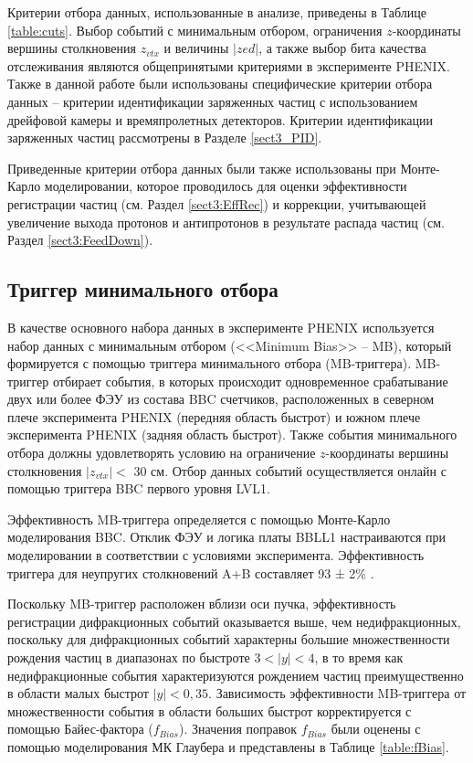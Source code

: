 Критерии отбора данных, использованные в анализе, приведены в Таблице \ref{table:cuts}. Выбор событий с минимальным отбором, ограничения $z$-координаты вершины столкновения $z_{vtx}$ и величины $|zed|$, а также выбор бита качества отслеживания являются общепринятыми критериями в эксперименте PHENIX. Также в данной работе были использованы специфические критерии отбора данных -- критерии идентификации заряженных частиц с использованием дрейфовой камеры и времяпролетных детекторов. Критерии идентификации заряженных частиц рассмотрены в Разделе \ref{sect3_PID}.

Приведенные критерии отбора данных были также использованы при Монте-Карло моделировании, которое проводилось для оценки эффективности регистрации частиц (см. Раздел \ref{sect3:EffRec}) и коррекции, учитывающей увеличение выхода протонов и антипротонов в результате распада частиц (см. Раздел \ref{sect3:FeedDown}). 

\subsection{Триггер минимального отбора}
В качестве основного набора данных в эксперименте PHENIX используется набор данных с минимальным отбором (<<Minimum Bias>> -- MB), который формируется с помощью триггера минимального отбора (MB-триггера).
MB-триггер отбирает события, в которых происходит одновременное срабатывание двух или более ФЭУ из состава BBC счетчиков, расположенных в северном плече эксперимента PHENIX (передняя область быстрот) и южном плече эксперимента PHENIX (задняя область быстрот).
Также события минимального отбора должны удовлетворять условию на ограничение $z$-координаты вершины столкновения $|z_{vtx}| < $ 30 см. Отбор данных событий осуществляется онлайн с помощью триггера BBC первого уровня LVL1.

Эффективность MB-триггера определяется с помощью Монте-Карло моделирования BBC. Отклик ФЭУ и логика платы BBLL1 настраиваются при моделировании в соответствии с условиями эксперимента. Эффективность триггера для неупругих столкновений A+B составляет 93 ± 2\% \cite{phi_LargeSysts}. 

Поскольку MB-триггер расположен вблизи оси пучка, эффективность регистрации дифракционных событий оказывается выше, чем недифракционных, поскольку для дифракционных событий характерны большие множественности рождения частиц в диапазонах по быстроте $3 <|y|<4$, в то время как недифракционные события характеризуются рождением частиц преимущественно в области малых быстрот $|y|<0,35$. Зависимость эффективности MB-триггера от множественности события в области больших быстрот корректируется с помощью Байес-фактора ($f_{Bias}$). 
Значения поправок $f_{Bias}$ были оценены с помощью моделирования МК Глаубера и представлены в Таблице \ref{table:fBias}.

